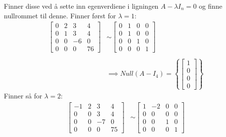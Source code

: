 \documentclass[11pt, a4paper, norsk]{NTNUoving}
\begin{document}
\begin{oppgave}
\begin{punkt}
            Finner disse ved å sette inn egenverdiene i ligningen $A - \lambda I_{n} = 0$ og finne nullrommet til denne. Finner først for $\lambda = 1$:
            \begin{align*}
                \begin{bmatrix}
                    0 & 2 & 3 & 4 \\
                    0 & 1 & 3 & 4 \\
                    0 & 0 & -6 & 0 \\
                    0 & 0 & 0 & 76
                \end{bmatrix} &\sim \begin{bmatrix}
                0 & 1 & 0 & 0 \\
                0 & 1 & 0 & 0 \\
                0 & 0 & 1 & 0 \\
                0 & 0 & 0 & 1
                \end{bmatrix}
                \\
                \\
                &\implies Null(A - I_{4}) = \left\{\begin{bmatrix}
                    1 \\
                    0 \\
                    0 \\
                    0
                \end{bmatrix}\right\}
            \end{align*}
            Finner så for $\lambda = 2$:
            \begin{align*}
                \begin{bmatrix}
                    -1 & 2 & 3 & 4 \\
                    0 & 0 & 3 & 4 \\
                    0 & 0 & -7 & 0 \\
                    0 & 0 & 0 & 75
                \end{bmatrix} &\sim \begin{bmatrix}
                1 & -2 & 0 & 0 \\
                0 & 0 & 0 & 0 \\
                0 & 0 & 1 & 0 \\
                0 & 0 & 0 & 1
                \end{bmatrix} 
                \\
                \\

\end{align*}
\end{punkt}
\end{oppgave}
\end{document}
